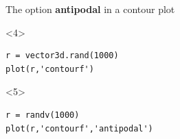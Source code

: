 \documentclass[compress]{beamer}
\begin{document}
\begin{frame}[fragile]
\begin{columns}
\begin{column}{8.5cm}
\begin{overlayarea}{8.5cm}{8cm}
The option \textbf{antipodal} in a contour plot
\begin{onlyenv}<4>
\begin{lstlisting}[style=input]
r = vector3d.rand(1000)
plot(r,'contourf')
\end{lstlisting}
\end{onlyenv}
\begin{onlyenv}<5>
\begin{lstlisting}[style=input]
r = randv(1000)
plot(r,'contourf','antipodal')
\end{lstlisting}
\end{onlyenv}
\end{overlayarea}
\end{column}
  \begin{column}{3.5cm}
  \end{column}
\end{columns}


\end{frame}
\end{document}
